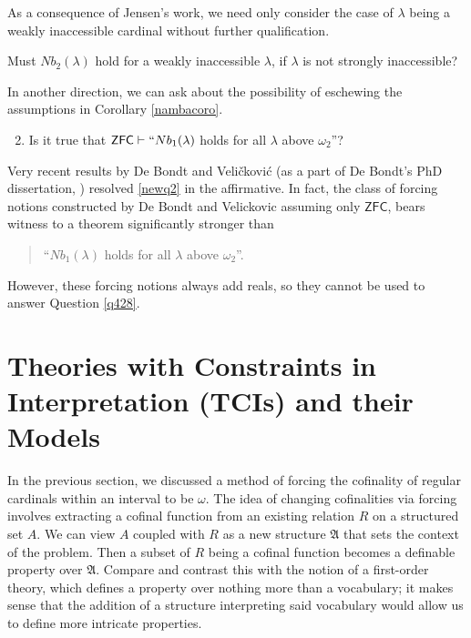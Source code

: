 \documentclass[12pt]{article}
\numberwithin{equation}{section}
\begin{document}
As a consequence of Jensen's work, we need only consider the case of $\lambda$ being a weakly inaccessible cardinal without further qualification.

\begin{ques}\label{q428}
Must $Nb_2(\lambda)$ hold for a weakly inaccessible $\lambda$, if $\lambda$ is not strongly inaccessible?
\end{ques}

In another direction, we can ask about the possibility of eschewing the assumptions in Corollary \ref{nambacoro}.

\begin{enumerate}[label=(Q\arabic*)]
    \setcounter{enumi}{1}
    \item\label{newq2} Is it true that $\mathsf{ZFC} \vdash ``Nb_1(\lambda)$ holds for all $\lambda$ above $\omega_2$''?
\end{enumerate}

Very recent results by De Bondt and Veli\v{c}kovi\'{c} (as a part of De Bondt's PhD dissertation, \cite{bendb}) resolved \ref{newq2} in the affirmative. In fact, the class of forcing notions constructed by De Bondt and Velickovic assuming only $\mathsf{ZFC}$, bears witness to a theorem significantly stronger than 
\begin{quote}
    ``$Nb_1(\lambda)$ holds for all $\lambda$ above $\omega_2$''.
\end{quote}
However, these forcing notions always add reals, so they cannot be used to answer Question \ref{q428}.

\section{Theories with Constraints in Interpretation (TCIs) and their Models}\label{TCIsec}

In the previous section, we discussed a method of forcing the cofinality of regular cardinals within an interval to be $\omega$. The idea of changing cofinalities via forcing involves extracting a cofinal function from an existing relation $R$ on a structured set $A$. We can view $A$ coupled with $R$ as a new structure $\mathfrak{A}$ that sets the context of the problem. Then a subset of $R$ being a cofinal function becomes a definable property over $\mathfrak{A}$. Compare and contrast this with the notion of a first-order theory, which defines a property over nothing more than a vocabulary; it makes sense that the addition of a structure interpreting said vocabulary would allow us to define more intricate properties. 
\end{document}
